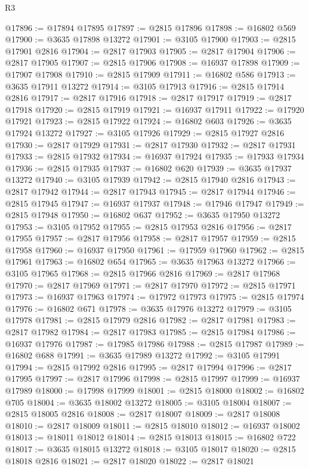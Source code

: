 \begin{lexlean}{R3}
\begin{coremodule}
@17896 := @17894 @17895
@17897 := @2815 @17896
@17898 := @16802 @569
@17900 := @3635 @17898 @13272
@17901 := @3105 @17900
@17903 := @2815 @17901 @2816
@17904 := @2817 @17903
@17905 := @2817 @17904
@17906 := @2817 @17905
@17907 := @2815 @17906
@17908 := @16937 @17898
@17909 := @17907 @17908
@17910 := @2815 @17909
@17911 := @16802 @586
@17913 := @3635 @17911 @13272
@17914 := @3105 @17913
@17916 := @2815 @17914 @2816
@17917 := @2817 @17916
@17918 := @2817 @17917
@17919 := @2817 @17918
@17920 := @2815 @17919
@17921 := @16937 @17911
@17922 := @17920 @17921
@17923 := @2815 @17922
@17924 := @16802 @603
@17926 := @3635 @17924 @13272
@17927 := @3105 @17926
@17929 := @2815 @17927 @2816
@17930 := @2817 @17929
@17931 := @2817 @17930
@17932 := @2817 @17931
@17933 := @2815 @17932
@17934 := @16937 @17924
@17935 := @17933 @17934
@17936 := @2815 @17935
@17937 := @16802 @620
@17939 := @3635 @17937 @13272
@17940 := @3105 @17939
@17942 := @2815 @17940 @2816
@17943 := @2817 @17942
@17944 := @2817 @17943
@17945 := @2817 @17944
@17946 := @2815 @17945
@17947 := @16937 @17937
@17948 := @17946 @17947
@17949 := @2815 @17948
@17950 := @16802 @637
@17952 := @3635 @17950 @13272
@17953 := @3105 @17952
@17955 := @2815 @17953 @2816
@17956 := @2817 @17955
@17957 := @2817 @17956
@17958 := @2817 @17957
@17959 := @2815 @17958
@17960 := @16937 @17950
@17961 := @17959 @17960
@17962 := @2815 @17961
@17963 := @16802 @654
@17965 := @3635 @17963 @13272
@17966 := @3105 @17965
@17968 := @2815 @17966 @2816
@17969 := @2817 @17968
@17970 := @2817 @17969
@17971 := @2817 @17970
@17972 := @2815 @17971
@17973 := @16937 @17963
@17974 := @17972 @17973
@17975 := @2815 @17974
@17976 := @16802 @671
@17978 := @3635 @17976 @13272
@17979 := @3105 @17978
@17981 := @2815 @17979 @2816
@17982 := @2817 @17981
@17983 := @2817 @17982
@17984 := @2817 @17983
@17985 := @2815 @17984
@17986 := @16937 @17976
@17987 := @17985 @17986
@17988 := @2815 @17987
@17989 := @16802 @688
@17991 := @3635 @17989 @13272
@17992 := @3105 @17991
@17994 := @2815 @17992 @2816
@17995 := @2817 @17994
@17996 := @2817 @17995
@17997 := @2817 @17996
@17998 := @2815 @17997
@17999 := @16937 @17989
@18000 := @17998 @17999
@18001 := @2815 @18000
@18002 := @16802 @705
@18004 := @3635 @18002 @13272
@18005 := @3105 @18004
@18007 := @2815 @18005 @2816
@18008 := @2817 @18007
@18009 := @2817 @18008
@18010 := @2817 @18009
@18011 := @2815 @18010
@18012 := @16937 @18002
@18013 := @18011 @18012
@18014 := @2815 @18013
@18015 := @16802 @722
@18017 := @3635 @18015 @13272
@18018 := @3105 @18017
@18020 := @2815 @18018 @2816
@18021 := @2817 @18020
@18022 := @2817 @18021

\end{coremodule}
\end{lexlean}
